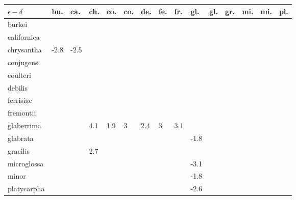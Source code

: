 \begin{table}[ht]
\centering
\begin{tabular}{lllllllllllllll}
  \hline
$\epsilon - \delta$ & bu. & ca. & ch. & co. & co. & de. & fe. & fr. & gl. & gl. & gr. & mi. & mi. & pl. \\ 
  \hline
burkei &  &  &  &  &  &  &  &  &  &  &  &  &  &  \\ 
  californica &  &  &  &  &  &  &  &  &  &  &  &  &  &  \\ 
  chrysantha & -2.8 & -2.5 &  &  &  &  &  &  &  &  &  &  &  &  \\ 
  conjugens &  &  &  &  &  &  &  &  &  &  &  &  &  &  \\ 
  coulteri &  &  &  &  &  &  &  &  &  &  &  &  &  &  \\ 
  debilis &  &  &  &  &  &  &  &  &  &  &  &  &  &  \\ 
  ferrisiae &  &  &  &  &  &  &  &  &  &  &  &  &  &  \\ 
  fremontii &  &  &  &  &  &  &  &  &  &  &  &  &  &  \\ 
  glaberrima &  &  & 4.1 & 1.9 & 3 & 2.4 & 3 & 3.1 &  &  &  &  &  &  \\ 
  glabrata &  &  &  &  &  &  &  &  & -1.8 &  &  &  &  &  \\ 
  gracilis &  &  & 2.7 &  &  &  &  &  &  &  &  &  &  &  \\ 
  microglossa &  &  &  &  &  &  &  &  & -3.1 &  &  &  &  &  \\ 
  minor &  &  &  &  &  &  &  &  & -1.8 &  &  &  &  &  \\ 
  platycarpha &  &  &  &  &  &  &  &  & -2.6 &  &  &  &  &  \\ 
   \hline
\end{tabular}
\end{table}
